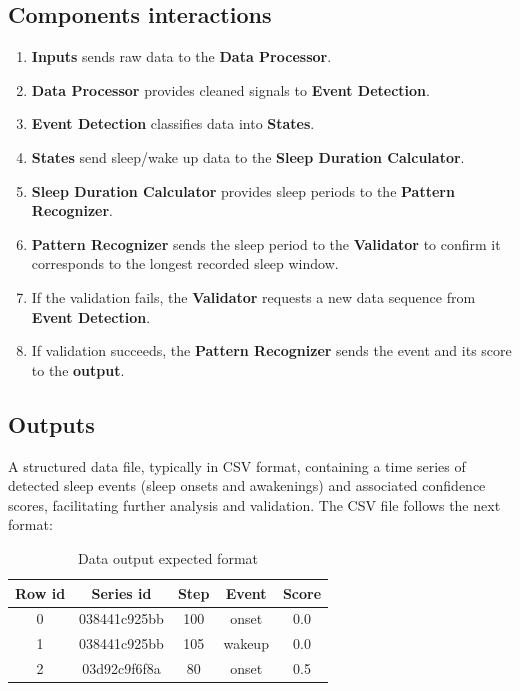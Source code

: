 \documentclass[conference]{IEEEtran}
\begin{document}
\subsection{Components interactions}
\begin{enumerate}
    \item \textbf{Inputs} sends raw data to the \textbf{Data Processor}.
    \item \textbf{Data Processor} provides cleaned signals to \textbf{Event Detection}.
    \item \textbf{Event Detection} classifies data into \textbf{States}.
    \item \textbf{States} send sleep/wake up data to the \textbf{Sleep Duration Calculator}.
    \item \textbf{Sleep Duration Calculator} provides sleep periods to the \textbf{Pattern Recognizer}.
    \item \textbf{Pattern Recognizer} sends the sleep period to the \textbf{Validator} to confirm it corresponds to the longest recorded sleep window.
    \item If the validation fails, the \textbf{Validator} requests a new data sequence from \textbf{Event Detection}.
    \item If validation succeeds, the \textbf{Pattern Recognizer} sends the event and its score to the \textbf{output}.
\end{enumerate}

\subsection{Outputs}
A structured data file, typically in CSV format, containing a time series of detected sleep events (sleep onsets and awakenings) 
and associated confidence scores, facilitating further analysis and validation. The CSV file follows the next format:
\begin{table}[ht]
    \caption{Data output expected format} 
    \centering 
    \begin{tabular}{c c c c c} %
    \hline
    Row id & Series id & Step & Event & Score \\ [0.5ex] 
    \hline
    0 & 038441c925bb & 100 & onset & 0.0 \\
    1 & 038441c925bb & 105 & wakeup & 0.0 \\
    2 & 03d92c9f6f8a & 80 & onset & 0.5 \\ [1ex]
    \hline
    \end{tabular}
    \end{table}
\end{document}
